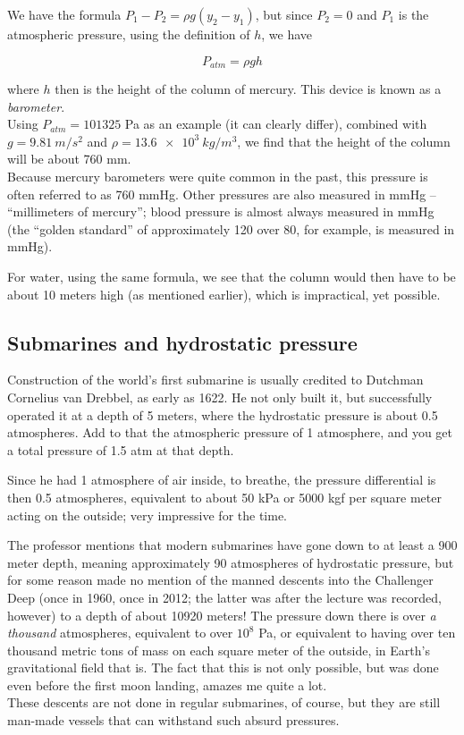 We have the formula $P_1 - P_2 = \rho g(y_2 - y_1)$, but since $P_2 = 0$ and $P_1$ is the atmospheric pressure, using the definition of $h$, we have

\begin{equation}
P_{atm} = \rho g h
\end{equation}

where $h$ then is the height of the column of mercury. This device is known as a \emph{barometer}.\\
Using $P_{atm} = 101325$ Pa as an example (it can clearly differ), combined with $g = \SI{9.81}{m/s^2}$ and $\rho = \SI{13.6e3}{kg/m^3}$, we find that the height of the column will be about 760 mm.\\
Because mercury barometers were quite common in the past, this pressure is often referred to as 760 mmHg. Other pressures are also measured in mmHg -- ``millimeters of mercury''; blood pressure is almost always measured in mmHg (the ``golden standard'' of approximately 120 over 80, for example, is measured in mmHg).

For water, using the same formula, we see that the column would then have to be about 10 meters high (as mentioned earlier), which is impractical, yet possible.

\subsection{Submarines and hydrostatic pressure}

Construction of the world's first submarine is usually credited to Dutchman Cornelius van Drebbel, as early as 1622. He not only built it, but successfully operated it at a depth of 5 meters, where the hydrostatic pressure is about 0.5 atmospheres. Add to that the atmospheric pressure of 1 atmosphere, and you get a total pressure of 1.5 atm at that depth.

Since he had 1 atmosphere of air inside, to breathe, the pressure differential is then 0.5 atmospheres, equivalent to about 50 kPa or 5000 kgf per square meter acting on the outside; very impressive for the time.

The professor mentions that modern submarines have gone down to at least a 900 meter depth, meaning approximately 90 atmospheres of hydrostatic pressure, but for some reason made no mention of the manned descents into the Challenger Deep (once in 1960, once in 2012; the latter was after the lecture was recorded, however) to a depth of about 10920 meters! The pressure down there is over \emph{a thousand} atmospheres, equivalent to over $10^8$ Pa, or equivalent to having over ten thousand metric tons of mass on each square meter of the outside, in Earth's gravitational field that is. The fact that this is not only possible, but was done even before the first moon landing, amazes me quite a lot.\\
These descents are not done in regular submarines, of course, but they are still man-made vessels that can withstand such absurd pressures.

